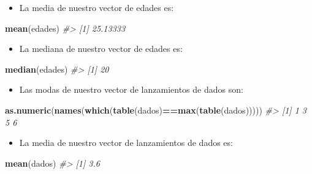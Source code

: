 \documentclass[
]{book}
\newenvironment{Shaded}{\begin{snugshade}}{\end{snugshade}}
\newcommand{\CommentTok}[1]{\textcolor[rgb]{0.56,0.35,0.01}{\textit{#1}}}
\newcommand{\KeywordTok}[1]{\textcolor[rgb]{0.13,0.29,0.53}{\textbf{#1}}}
\newcommand{\NormalTok}[1]{#1}
\newcommand{\OperatorTok}[1]{\textcolor[rgb]{0.81,0.36,0.00}{\textbf{#1}}}
\providecommand{\tightlist}{%
  \setlength{\itemsep}{0pt}\setlength{\parskip}{0pt}}
\theoremstyle{definition}
\theoremstyle{definition}
\theoremstyle{definition}
\theoremstyle{remark}
\begin{document}
\begin{itemize}
\tightlist
\item
  La media de nuestro vector de edades es:
\end{itemize}

\begin{Shaded}
\begin{Highlighting}[]
\KeywordTok{mean}\NormalTok{(edades)}
\CommentTok{\#\textgreater{} [1] 25.13333}
\end{Highlighting}
\end{Shaded}

\begin{itemize}
\tightlist
\item
  La mediana de nuestro vector de edades es:
\end{itemize}

\begin{Shaded}
\begin{Highlighting}[]
\KeywordTok{median}\NormalTok{(edades)}
\CommentTok{\#\textgreater{} [1] 20}
\end{Highlighting}
\end{Shaded}

\begin{itemize}
\tightlist
\item
  Las modas de nuestro vector de lanzamientos de dados son:
\end{itemize}

\begin{Shaded}
\begin{Highlighting}[]
\KeywordTok{as.numeric}\NormalTok{(}\KeywordTok{names}\NormalTok{(}\KeywordTok{which}\NormalTok{(}\KeywordTok{table}\NormalTok{(dados)}\OperatorTok{==}\KeywordTok{max}\NormalTok{(}\KeywordTok{table}\NormalTok{(dados))))) }
\CommentTok{\#\textgreater{} [1] 1 3 5 6}
\end{Highlighting}
\end{Shaded}

\begin{itemize}
\tightlist
\item
  La media de nuestro vector de lanzamientos de dados es:
\end{itemize}

\begin{Shaded}
\begin{Highlighting}[]
\KeywordTok{mean}\NormalTok{(dados)}
\CommentTok{\#\textgreater{} [1] 3.6}
\end{Highlighting}
\end{Shaded}
\end{document}

